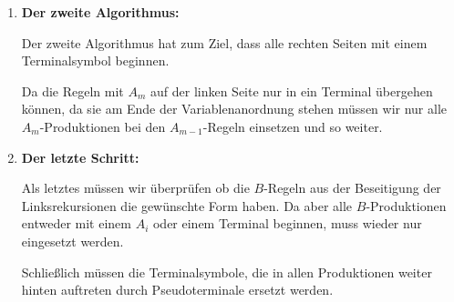 \begin{enumerate}
	\item \textbf{Der zweite Algorithmus:}

	Der zweite Algorithmus hat zum Ziel, dass alle rechten Seiten mit einem Terminalsymbol beginnen.

	Da die Regeln mit $A_m$ auf der linken Seite nur in ein Terminal übergehen können, da sie am Ende der Variablenanordnung stehen müssen wir nur alle $A_m$-Produktionen bei den $A_{m-1}$-Regeln einsetzen und so weiter.

	\item \textbf{Der letzte Schritt:}

	Als letztes müssen wir überprüfen ob die $B$-Regeln aus der Beseitigung der Linksrekursionen die gewünschte Form haben.
	Da aber alle $B$-Produktionen entweder mit einem $A_i$ oder einem Terminal beginnen, muss wieder nur eingesetzt werden.

	Schließlich müssen die Terminalsymbole, die in allen Produktionen weiter hinten auftreten durch Pseudoterminale ersetzt werden.
\end{enumerate}

